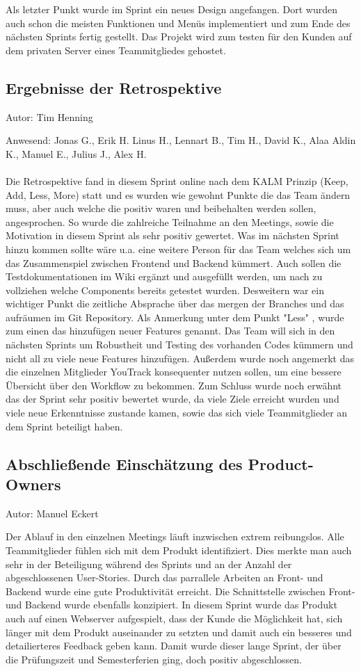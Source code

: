 Als letzter Punkt wurde im Sprint ein neues Design angefangen. Dort wurden auch schon die meisten Funktionen und Menüs implementiert und zum Ende des nächsten Sprints fertig gestellt. Das Projekt wird zum testen für den Kunden auf dem privaten Server eines Teammitgliedes gehostet.


\subsection{Ergebnisse der Retrospektive}
{\small Autor: Tim Henning}

Anwesend: Jonas G., Erik H. Linus H., Lennart B., Tim H., David K., Alaa Aldin K., Manuel E., Julius J., Alex H.\\
\\

Die Retrospektive fand in diesem Sprint online nach dem KALM Prinzip (Keep, Add, Less, More) statt und es wurden wie gewohnt Punkte die das Team ändern muss, aber auch welche die positiv waren und beibehalten werden sollen, angesprochen. So wurde die zahlreiche Teilnahme an den Meetings, sowie die Motivation in diesem Sprint als sehr positiv gewertet. Was im nächsten Sprint hinzu kommen sollte wäre u.a. eine weitere Person für das Team welches sich um das Zusammenspiel zwischen Frontend und Backend kümmert. Auch sollen die Testdokumentationen im Wiki ergänzt und ausgefüllt werden, um nach zu vollziehen welche Components bereits getestet wurden. Desweitern war ein wichtiger Punkt die zeitliche Absprache über das mergen der Branches und das aufräumen im Git Repository. Als Anmerkung unter dem Punkt "Less" , wurde zum einen das hinzufügen neuer Features genannt. Das Team will sich in den nächsten Sprints um Robustheit und Testing des vorhanden Codes kümmern und nicht all zu viele neue Features hinzufügen. Außerdem wurde noch angemerkt das die einzelnen Mitglieder YouTrack konsequenter nutzen sollen, um eine bessere Übersicht über den Workflow zu bekommen. Zum Schluss wurde noch erwähnt das der Sprint sehr positiv bewertet wurde, da viele Ziele erreicht wurden und viele neue Erkenntnisse zustande kamen, sowie das sich viele Teammitglieder an dem Sprint beteiligt haben.

\subsection{Abschließende Einschätzung des Product-Owners}
{\small Autor: Manuel Eckert}

Der Ablauf in den einzelnen Meetings läuft inzwischen extrem reibungslos. Alle Teammitglieder fühlen sich mit dem Produkt identifiziert. Dies merkte man auch sehr in der Beteiligung während des Sprints und an der Anzahl der abgeschlossenen User-Stories. Durch das parrallele Arbeiten an Front- und Backend wurde eine gute Produktivität erreicht. Die Schnittstelle zwischen Front- und Backend wurde ebenfalls konzipiert. 
In diesem Sprint wurde das Produkt auch auf einen Webserver aufgespielt, dass der Kunde die Möglichkeit hat, sich länger mit dem Produkt auseinander zu setzten und damit auch ein besseres und detailierteres Feedback geben kann. 
Damit wurde dieser lange Sprint, der über die Prüfungszeit und Semesterferien ging, doch positiv abgeschlossen.

